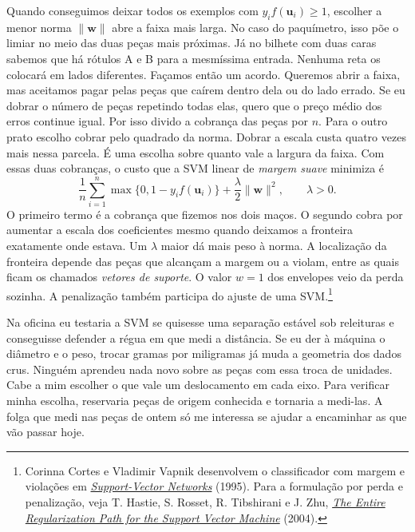 \documentclass[12pt,oneside]{article}
\newcommand{\bookanchor}[1]{\phantomsection\label{#1}}
\begin{document}
Quando\bookanchor{topic-06-7} conseguimos deixar todos os exemplos com $y_i f(\boldsymbol u_i)\geq1$, escolher a menor norma $\lVert\boldsymbol w\rVert$ abre a faixa mais larga. No caso do paquímetro, isso põe o limiar no meio das duas peças mais próximas. Já no bilhete com duas caras sabemos que há rótulos A e B para a mesmíssima entrada. Nenhuma reta os colocará em lados diferentes. Façamos então um acordo. Queremos abrir a faixa, mas aceitamos pagar pelas peças que caírem dentro dela ou do lado errado. Se eu dobrar o número de peças repetindo todas elas, quero que o preço médio dos erros continue igual. Por isso divido a cobrança das peças por $n$. Para o outro prato escolho cobrar pelo quadrado da norma. Dobrar a escala custa quatro vezes mais nessa parcela. É uma escolha sobre quanto vale a largura da faixa. Com essas duas cobranças, o custo que a SVM linear de \emph{margem suave} minimiza é
\[
 \frac1n\sum_{i=1}^n \max\{0,1-y_i f(\boldsymbol u_i)\}
       +\frac{\lambda}{2}\lVert\boldsymbol w\rVert^2,\qquad \lambda>0.
\]
O\bookanchor{topic-06-8} primeiro termo é a cobrança que fizemos nos dois maços. O segundo cobra por aumentar a escala dos coeficientes mesmo quando deixamos a fronteira exatamente onde estava. Um $\lambda$ maior dá mais peso à norma. A localização da fronteira depende das peças que alcançam a margem ou a violam, entre as quais ficam os chamados \emph{vetores de suporte}. O valor $w=1$ dos envelopes veio da perda sozinha. A penalização também participa do ajuste de uma SVM.\footnote{Corinna Cortes e Vladimir Vapnik desenvolvem o classificador com margem e violações em \href{https://doi.org/10.1007/BF00994018}{\emph{Support-Vector Networks}} (1995). Para a formulação por perda e penalização, veja T. Hastie, S. Rosset, R. Tibshirani e J. Zhu, \href{https://jmlr.org/papers/v5/hastie04a.html}{\emph{The Entire Regularization Path for the Support Vector Machine}} (2004).}

Na oficina eu testaria a SVM se quisesse uma separação estável sob releituras e conseguisse defender a régua em que medi a distância. Se eu der à máquina o diâmetro e o peso, trocar gramas por miligramas já muda a geometria dos dados crus. Ninguém aprendeu nada novo sobre as peças com essa troca de unidades. Cabe a mim escolher o que vale um deslocamento em cada eixo. Para verificar minha escolha, reservaria peças de origem conhecida e tornaria a medi-las. A folga que medi nas peças de ontem só me interessa se ajudar a encaminhar as que vão passar hoje.
\end{document}
